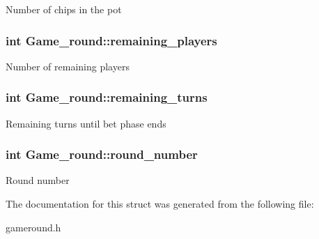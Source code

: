 Number of chips in the pot \hypertarget{structGame__round_a11790ed09816dd873ec0dd4af2975069}{
\subsubsection[{remaining\+\_\+players}]{\setlength{\rightskip}{0pt plus 5cm}int Game\+\_\+round\+::remaining\+\_\+players}}\label{structGame__round_a11790ed09816dd873ec0dd4af2975069}
Number of remaining players \hypertarget{structGame__round_a40236e950983508542529a1e5bba790b}{
\subsubsection[{remaining\+\_\+turns}]{\setlength{\rightskip}{0pt plus 5cm}int Game\+\_\+round\+::remaining\+\_\+turns}}\label{structGame__round_a40236e950983508542529a1e5bba790b}
Remaining turns until bet phase ends \hypertarget{structGame__round_adab8aba7da87ebc3ccf673e7a6e225db}{
\subsubsection[{round\+\_\+number}]{\setlength{\rightskip}{0pt plus 5cm}int Game\+\_\+round\+::round\+\_\+number}}\label{structGame__round_adab8aba7da87ebc3ccf673e7a6e225db}
Round number 

The documentation for this struct was generated from the following file\+:\begin{DoxyCompactItemize}
\item 
gameround.\+h\end{DoxyCompactItemize}
